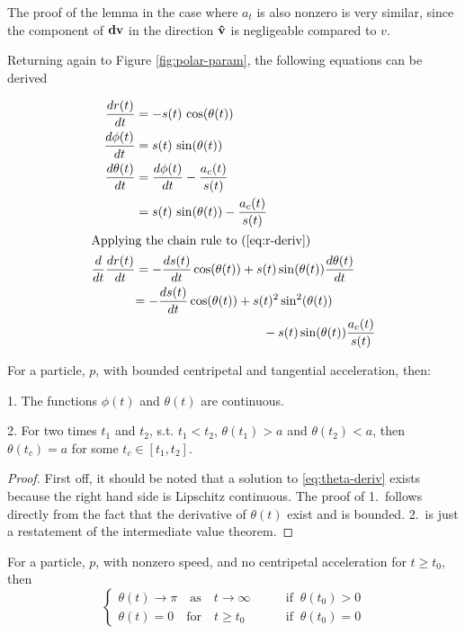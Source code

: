 The proof of the lemma in the case where $a_t$ is also nonzero is very similar, since the component of $\mathbf{dv}$ in the direction $\mathbf{\hat{v}}$ is negligeable compared to $v$.

Returning again to Figure \ref{fig:polar-param}, the following equations can be derived

\begin{align}
  \frac{dr(t)}{dt}& = -s(t) \, \cos\paren{\theta(t)}\label{eq:r-deriv}\\
  \frac{d\phi(t)}{dt}& = s(t) \, \sin\paren{\theta(t)}\label{eq:phi-deriv}\\
  \frac{d\theta(t)}{dt}& = \frac{d\phi(t)}{dt} - \frac{a_c(t)}{s(t)}\\
  &= s(t) \, \sin\paren{\theta(t)} - \frac{a_c(t)}{s(t)}\label{eq:theta-deriv}\\
  \intertext{Applying the chain rule to (\ref{eq:r-deriv})}
  \frac{d}{dt} \frac{dr(t)}{dt}& = -\frac{ds(t)}{dt} \cos\paren{\theta(t)} + s(t) \sin\paren{\theta(t)} \frac{d\theta(t)}{dt}\\
  &\begin{aligned}
    = -\frac{ds(t)}{dt} \cos\paren{\theta(t)} &+ s(t)^2 \sin^2\paren{\theta(t)}\\
    &\qquad - s(t) \sin\paren{\theta(t)} \frac{a_c(t)}{s(t)}\label{eq:r-deriv-2}
  \end{aligned}
\end{align}

\begin{lemma}
  For a particle, $p$, with bounded centripetal and tangential acceleration, then: 

  1. The functions $\phi(t)$ and $\theta(t)$ are continuous. 

  2. For two times $t_1$ and $t_2$, s.t. $t_1 < t_2$, $\theta(t_1) > a$ and $\theta(t_2) < a$, then $\theta(t_c) = a$ for some $t_c \in [t_1, t_2]$.
\end{lemma}

\begin{proof}
First off, it should be noted that a solution to \ref{eq:theta-deriv} exists because the right hand side is Lipschitz continuous. The proof of 1.\ follows directly from the fact that the derivative of $\theta(t)$ exist and is bounded. 2.\ is just a restatement of the intermediate value theorem.
\end{proof}

\begin{lemma}
  For a particle, $p$, with nonzero speed, and no centripetal acceleration for $t \ge t_0$, then
  \[
    \begin{cases}
      \theta(t) \to \pi \quad \text{as} \quad t \to \infty \qquad &\text{if} \;\; \theta(t_0) > 0\\
      \theta(t) = 0 \quad \text{for} \quad t \ge t_0 \qquad &\text{if} \;\; \theta(t_0) = 0
    \end{cases}
  \]
\end{lemma}

